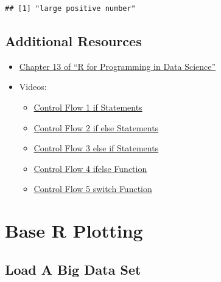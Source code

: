 \documentclass[
]{book}
\providecommand{\tightlist}{%
  \setlength{\itemsep}{0pt}\setlength{\parskip}{0pt}}
\begin{document}
\begin{verbatim}
## [1] "large positive number"
\end{verbatim}

\hypertarget{additional-resources-3}{%
\section{Additional Resources}\label{additional-resources-3}}

\begin{itemize}
\tightlist
\item
  \href{https://bookdown.org/rdpeng/rprogdatascience/functions.html\#the-...-argument}{Chapter 13 of ``R for Programming in Data Science''}
\item
  Videos:

  \begin{itemize}
  \tightlist
  \item
    \href{https://ucr.yuja.com/V/Video?v=2369005\&node=8488277\&a=1089164180\&autoplay=1}{Control Flow 1 \textbar{} if Statements}
  \item
    \href{https://ucr.yuja.com/V/Video?v=2369004\&node=8488276\&a=68950775\&autoplay=1}{Control Flow 2 \textbar{} if else Statements}
  \item
    \href{https://ucr.yuja.com/V/Video?v=2369003\&node=8488275\&a=577245814\&autoplay=1}{Control Flow 3 \textbar{} else if Statements}
  \item
    \href{https://ucr.yuja.com/V/Video?v=2369002\&node=8488274\&a=2043700498\&autoplay=1}{Control Flow 4 \textbar{} ifelse Function}
  \item
    \href{https://ucr.yuja.com/V/Video?v=2369001\&node=8488273\&a=523725749\&autoplay=1}{Control Flow 5 \textbar{} switch Function}
  \end{itemize}
\end{itemize}

\hypertarget{base-r-plotting}{%
\chapter{Base R Plotting}\label{base-r-plotting}}

\hypertarget{load-a-big-data-set}{%
\section{Load A Big Data Set}\label{load-a-big-data-set}}
\end{document}
